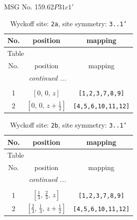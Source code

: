 \documentclass[fleqn,8pt]{jsarticle}
\begin{document}
\setcounter{MaxMatrixCols}{32}

\renewcommand{\tablename}{Table~}
\renewcommand{\figurename}{Figure~}
\begin{center}
\LARGE
MSG No. 159.62\quad$P31c1'$
\end{center}
\renewcommand{\arraystretch}{1.2}
\begin{longtable}{ccc}
\caption{Wyckoff site: {\tt 2a}, site symmetry: {\tt 3..1'}}
 \\
 \hline \hline
No. & position & mapping \\ \hline \endfirsthead

\multicolumn{2}{l}{\tablename\ \thetable{}} \\
 \hline \hline
No. & position & mapping \\ \hline \endhead

 \hline \hline
\multicolumn{2}{r}{\footnotesize\it continued ...} \\ \endfoot

 \hline \hline
\multicolumn{2}{r}{} \\ \endlastfoot

1 & $\left[ 0,\, 0,\, z \right]$ & {\tt [1,2,3,7,8,9]} \\ \hline
2 & $\left[ 0,\, 0,\, z + \frac{1}{2} \right]$ & {\tt [4,5,6,10,11,12]} \\
\end{longtable}
\renewcommand{\arraystretch}{1.2}
\begin{longtable}{ccc}
\caption{Wyckoff site: {\tt 2b}, site symmetry: {\tt 3..1'}}
 \\
 \hline \hline
No. & position & mapping \\ \hline \endfirsthead

\multicolumn{2}{l}{\tablename\ \thetable{}} \\
 \hline \hline
No. & position & mapping \\ \hline \endhead

 \hline \hline
\multicolumn{2}{r}{\footnotesize\it continued ...} \\ \endfoot

 \hline \hline
\multicolumn{2}{r}{} \\ \endlastfoot

1 & $\left[ \frac{1}{3},\, \frac{2}{3},\, z \right]$ & {\tt [1,2,3,7,8,9]} \\ \hline
2 & $\left[ \frac{2}{3},\, \frac{1}{3},\, z + \frac{1}{2} \right]$ & {\tt [4,5,6,10,11,12]} \\
\end{longtable}
\end{document}
